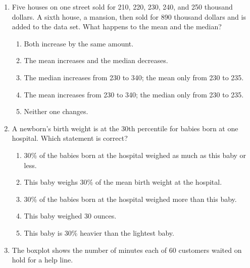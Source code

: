 \documentclass[12pt]{article}
\begin{document}
\begin{enumerate}[leftmargin=1.9em, itemsep=0.13in]
  \boxguard[11]
  \item Five houses on one street sold for 210, 220, 230, 240, and 250 thousand dollars. A
        sixth house, a mansion, then sold for 890 thousand dollars and is added to the data
        set. What happens to the mean and the median?
        \begin{enumerate}[label=\textbf{(\Alph*)}, leftmargin=2.2em, itemsep=2pt]
          \item Both increase by the same amount.
          \item The mean increases and the median decreases.
          \item The median increases from 230 to 340; the mean only from 230 to 235.
          \item The mean increases from 230 to 340; the median only from 230 to 235.
          \item Neither one changes.\hfill{}\rule[-0.2in]{0pt}{0.48in}
        \end{enumerate}

  \boxguard[10]
  \item A newborn's birth weight is at the 30th percentile for babies born at one hospital.
        Which statement is correct?
        \begin{enumerate}[label=\textbf{(\Alph*)}, leftmargin=2.2em, itemsep=2pt]
          \item 30\% of the babies born at the hospital weighed as much as this baby or less.
          \item This baby weighs 30\% of the mean birth weight at the hospital.
          \item 30\% of the babies born at the hospital weighed more than this baby.
          \item This baby weighed 30 ounces.
          \item This baby is 30\% heavier than the lightest baby.\hfill{}\rule[-0.2in]{0pt}{0.48in}
        \end{enumerate}

  \boxguard[16]
  \item The boxplot shows the number of minutes each of 60 customers waited on hold for a
        help line.


\end{enumerate}
\end{document}
